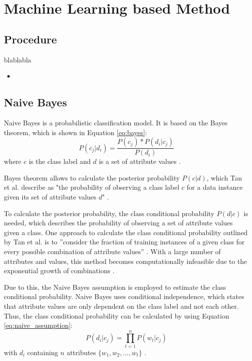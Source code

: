 \section{Machine Learning based Method}
\subsection{Procedure}
blablabla
\begin{itemize}
    \item 
\end{itemize}
    \subsection{Naive Bayes}
        Naive Bayes is a probabilistic classification model. It is based on the Bayes theorem, which is shown in Equation \eqref{eq:bayes}:
        \begin{equation}
            \label{eq:bayes}
            P(c_j|d_i) = \frac{P(c_j) * P(d_i|c_j)}{P(d_i)}
        \end{equation}
        where $c$ is the class label and $d$ is a set of attribute values \cite{DBLP:books/aw/TanSKK2019}. 
        

        Bayes theorem allows to calculate the posterior probability $P(c|d)$, which Tan et al. describe as "the probability of observing a class label $c$ for a data instance given its set of attribute values $d$" \cite[p.~418]{DBLP:books/aw/TanSKK2019}. 

        To calculate the posterior probability, the class conditional probability $P(d|c)$ is needed, which describes the probability of observing a set of attribute values given a class. One approach to calculate the class conditional probability outlined by Tan et al. is to ''consider the fraction of training instances of a given class for every possible combination of attribute values'' \cite[p.~419]{DBLP:books/aw/TanSKK2019}. With a large number of attributes and values, this method becomes computationally infeasible due to the exponential growth of combinations \cite{DBLP:books/aw/TanSKK2019}.

        Due to this, the Naive Bayes assumption is employed to estimate the class conditional probability. Naive Bayes uses conditional independence, which states that attribute values are only dependent on the class label and not each other. Thus, the class conditional probability can be calculated by using Equation \eqref{eq:naive_assumption}:
        \begin{equation}
            \label{eq:naive_assumption}
            P(d_i|c_j) = \prod_{t=1}^{n}P(w_{t}|c_j)
        \end{equation}
        with $d_i$ containing $n$ attributes $\{w_1,w_2,...,w_t\}$ \cite{DBLP:books/aw/TanSKK2019}.

